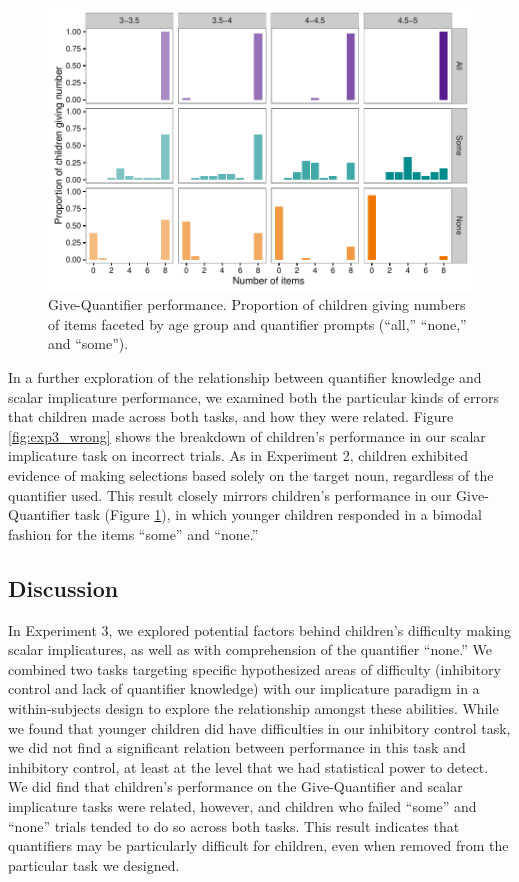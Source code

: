 \documentclass[man]{apa2}
\begin{document}
{\begin{figure}
 \begin{center}
  \includegraphics[width=6in]{figures/exp3_GQhist.pdf}
  \caption{\label{fig:GQ_spread} Give-Quantifier performance. Proportion of children giving numbers of items faceted by age group and quantifier prompts (``all,'' ``none,'' and ``some'').}
 \end{center}
\end{figure}


In a further exploration of the relationship between quantifier knowledge and scalar implicature performance, we examined both the particular kinds of errors that children made across both tasks, and how they were related. Figure \ref{fig:exp3_wrong} shows the breakdown of children's performance in our scalar implicature task on incorrect trials. As in Experiment 2, children exhibited evidence of making selections based solely on the target noun, regardless of the quantifier used. This result closely mirrors children's performance in our Give-Quantifier task (Figure \ref{fig:GQ_spread}), in which younger children responded in a bimodal fashion for the items ``some'' and ``none.''


\subsection{Discussion}

In Experiment 3, we explored potential factors behind children's difficulty making scalar implicatures, as well as with comprehension of the quantifier ``none.'' We combined two tasks targeting specific hypothesized areas of difficulty (inhibitory control and lack of quantifier knowledge) with our implicature paradigm in a within-subjects design to explore the relationship amongst these abilities. While we found that younger children did have difficulties in our inhibitory control task, we did not find a significant relation between performance in this task and inhibitory control, at least at the level that we had statistical power to detect. We did find that children's performance on the Give-Quantifier and scalar implicature tasks were related, however, and children who failed ``some'' and ``none'' trials tended to do so across both tasks. This result indicates that quantifiers may be particularly difficult for children, even when removed from the particular task we designed.

}
\end{document}
